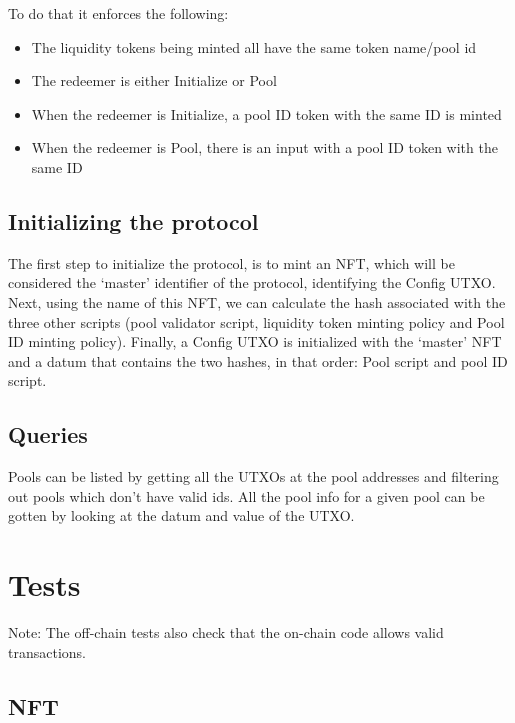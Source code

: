 \documentclass{article}
\begin{document}
To do that it enforces the following:
\begin{itemize}
	\item The liquidity tokens being minted all have the same token name/pool id
	\item The redeemer is either Initialize or Pool
  \item When the redeemer is Initialize, a pool ID token with the same ID is
    minted
  \item When the redeemer is Pool, there is an input with a pool ID token with
    the same ID
\end{itemize}

\subsection{Initializing the protocol}

The first step to initialize the protocol, is to mint an NFT, which will be
considered the `master' identifier of the protocol, identifying the Config UTXO.
Next, using the name of this NFT, we can calculate the hash associated with the
three other scripts (pool validator script, liquidity token minting policy and
Pool ID minting policy). Finally, a Config UTXO is initialized with the `master'
NFT and a datum that contains the two hashes, in that order: Pool script and
pool ID script.

\subsection{Queries}

Pools can be listed by getting all the UTXOs at the pool addresses and filtering
out pools which don't have valid ids. All the pool info for a given pool
can be gotten by looking at the datum and value of the UTXO.

\section{Tests}


Note: The off-chain tests also check that the on-chain code allows valid
transactions.




\subsection*{NFT}
\end{document}
